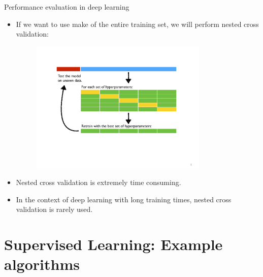 \documentclass[xcolor=pdftex,dvipsnames,table]{beamer}
\begin{document}
\begin{frame}{Performance evaluation in deep learning}
	\begin{itemize}
		\item<1-> If we want to use make of the entire training set, we will perform nested cross validation:
 		\begin{figure}[htb]
 			\includegraphics[width=0.8\textwidth]{../graphics/NestedCrossValidation.pdf}
 		\end{figure}
		\item<2-> Nested cross validation is extremely time consuming.
		\item<3-> In the context of deep learning with long training times, nested cross validation is rarely used.
	\end{itemize}
\end{frame}



\section{Supervised Learning: Example algorithms}
\end{document}

